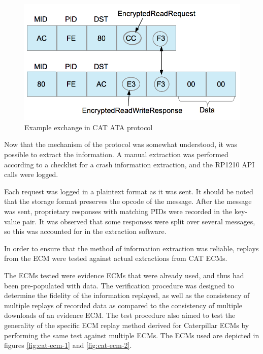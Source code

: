 \begin{figure}[h]
  \centering
  \includegraphics[scale=0.75]{cat-protocol-diagram}
  \caption{Example exchange in CAT ATA protocol}
  \label{fig:ataprotocol}
\end{figure}


Now that the mechanism of the protocol was somewhat understood, it was possible to extract the information.
A manual extraction was performed according to a checklist for a crash information extraction, and the 
RP1210 API calls were logged.

Each request was logged in a plaintext format as it was sent. 
It should be noted that the storage format preserves the opcode of the message. After the message was sent, proprietary
responses with matching PIDs were recorded in the key-value pair. It was observed that some responses were split over
several messages, so this was accounted for in the extraction software.


In order to ensure that the method of information extraction was reliable, replays from the ECM were tested against
actual extractions from CAT ECMs.


The ECMs tested were evidence ECMs that were already used, and thus had been pre-populated with data.
The verification procedure was designed to determine the fidelity of the information replayed, as well as the
consistency of multiple replays of recorded data as compared to the consistency of multiple downloads of an
evidence ECM. The test procedure also aimed to test the generality of the specific ECM replay method derived
for Caterpillar ECMs by performing the same test against multiple ECMs. The ECMs used are depicted in figures
\ref{fig:cat-ecm-1} and \ref{fig:cat-ecm-2}.


